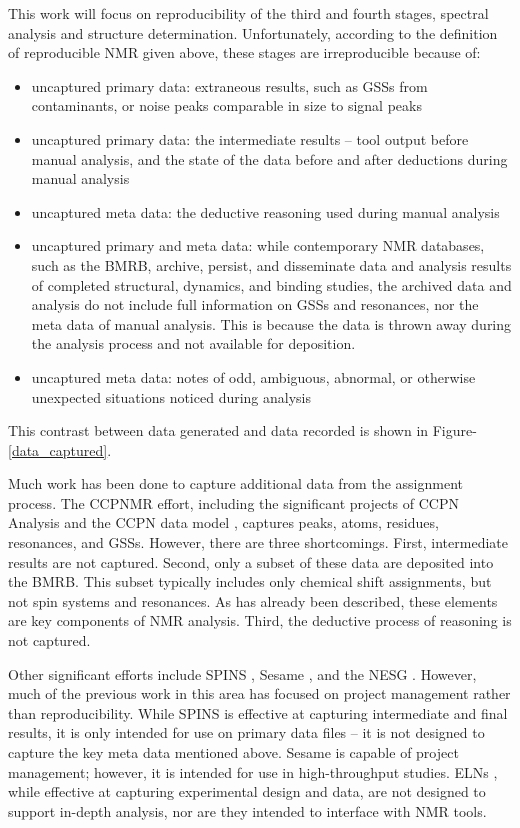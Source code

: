 This work will focus on reproducibility of the third and fourth stages, 
spectral analysis and structure determination.  Unfortunately, according to 
the definition of reproducible NMR given above, these stages are irreproducible 
because of:
\begin{itemize}
  \item uncaptured primary data: extraneous results, such as GSSs from 
  contaminants, or noise peaks comparable in size to signal peaks
  \item uncaptured primary data: the intermediate results -- tool output before 
  manual analysis, and the state of the data before and after deductions during 
  manual analysis
  \item uncaptured meta data:  the deductive reasoning used during manual analysis
  \item uncaptured primary and meta data: while contemporary NMR databases, 
  such as the BMRB, archive, persist, and disseminate data and analysis 
  results of completed structural, dynamics, and binding studies, the 
  archived data and analysis do not include full information on GSSs 
  and resonances, nor the meta data of manual analysis.  This is because the 
  data is thrown away during the analysis process and not available for deposition.
  \item uncaptured meta data: notes of odd, ambiguous, abnormal, or 
    otherwise unexpected situations noticed during analysis
    \cite{nuseibeh2000inconsistency}
\end{itemize}
This contrast between data generated and data recorded is shown in 
Figure-\ref{data_captured}.

Much work has been done to capture additional data from the assignment process.  
The CCPNMR effort, including the significant projects of CCPN Analysis and the 
CCPN data model \cite{ccpn}, captures peaks, atoms, residues, 
resonances, and GSSs.  
However, there are three shortcomings.  First, intermediate results are not 
captured.  Second, only a subset of these data are deposited into the BMRB.  
This subset typically includes only chemical shift assignments, but not spin 
systems and resonances.   As has already been described, these elements are 
key components of NMR analysis.  Third, the deductive process of reasoning 
is not captured.

Other significant efforts include SPINS \cite{baran2006spins}, 
Sesame \cite{sesame}, and the NESG \cite{nesg2005nmr}.  
However, much of the previous 
work in this area has focused on project management rather than reproducibility.
While SPINS is effective at capturing intermediate and final results, it is 
only intended for use on primary data files -- it is not designed to capture 
the key meta data mentioned above.  Sesame is capable of project management; 
however, it is intended for use in high-throughput studies.  ELNs 
\cite{rubacha2011eln}, while effective at capturing experimental design and
data, are not designed to support in-depth analysis, nor are they intended
to interface with NMR tools.

